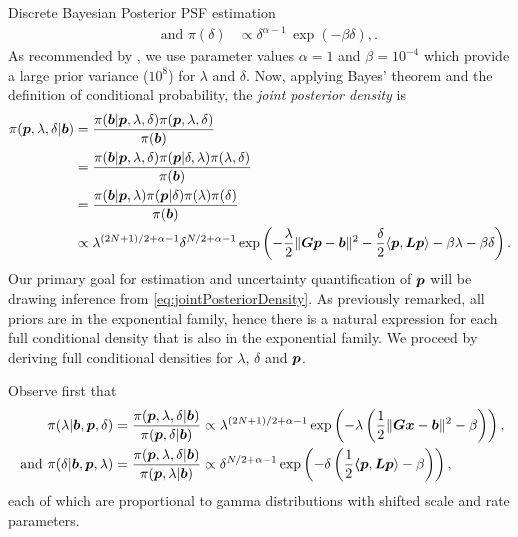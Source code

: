 \begin{chapter}{Discrete Bayesian Posterior PSF estimation}
\begin{align}
\quad\text{ and }\pi(\delta) &\propto \delta^{\alpha-1}\,\exp(-\beta\delta), \label{eq:lambdaPrior}.
\end{align}
As recommended by \citep{higdon2006primer}, we use parameter values $\alpha = 1$ and $\beta =  10^{-4}$ which provide a large prior variance ($10^8$) for $\lambda$ and $\delta$. 
Now, applying Bayes' theorem and the definition of conditional probability, the \emph{joint posterior density} is
\begin{align}
  \pi(\mbox{\boldmath$p$},\lambda,\delta|\mbox{\boldmath$b$}) 
    &= \frac{\pi(\mbox{\boldmath$b$}|\mbox{\boldmath$p$},\lambda,\delta) \pi(\mbox{\boldmath$p$},\lambda,\delta)}{\pi(\mbox{\boldmath$b$})} \nonumber \\
    &= \frac{\pi(\mbox{\boldmath$b$}|\mbox{\boldmath$p$},\lambda,\delta) \pi(\mbox{\boldmath$p$}| \delta,\lambda) \pi(\lambda,\delta)}{\pi(\mbox{\boldmath$b$})} \nonumber \\
    &= \frac{\pi(\mbox{\boldmath$b$}|\mbox{\boldmath$p$},\lambda) \pi(\mbox{\boldmath$p$}| \delta) \pi(\lambda)\pi(\delta)}{\pi(\mbox{\boldmath$b$})} \nonumber \\
    &\propto \lambda^{(2N+1)/2+\alpha-1}\delta^{N/2+\alpha-1} \exp\left(-\frac{\lambda}{2}\|\mbox{\boldmath$Gp$} - \mbox{\boldmath$b$}\|^2 - \frac{\delta}{2}\langle \mbox{\boldmath$p$}, \mbox{\boldmath$L$} \mbox{\boldmath$p$}\rangle - \beta\lambda - \beta\delta \right). \label{eq:jointPosteriorDensity}
\end{align}
Our primary goal for estimation and uncertainty quantification of $\mbox{\boldmath$p$}$ will be drawing inference from \eqref{eq:jointPosteriorDensity}.
As previously remarked, all priors are in the exponential family, hence there is a natural expression for each full conditional density that is also in the exponential family.
We proceed by deriving full conditional densities for $\lambda$, $\delta$ and $\mbox{\boldmath$p$}$.

Observe first that
\begin{align}
  \pi(\lambda| \mbox{\boldmath$b$},\mbox{\boldmath$p$},\delta) 
  &= \frac{\pi(\mbox{\boldmath$p$},\lambda,\delta|\mbox{\boldmath$b$})}{\pi(\mbox{\boldmath$p$},\delta|\mbox{\boldmath$b$}) } 
  \propto \lambda^{(2N+1)/2+\alpha-1}\exp\left(-\lambda\left(\frac{1}{2}\|\mbox{\boldmath$Gx$} - \mbox{\boldmath$b$}\|^2 - \beta\right)  \right), \nonumber\\
\text{ and }\pi(\delta| \mbox{\boldmath$b$},\mbox{\boldmath$p$},\lambda) 
  &= \frac{\pi(\mbox{\boldmath$p$},\lambda,\delta|\mbox{\boldmath$b$})}{\pi(\mbox{\boldmath$p$},\lambda|\mbox{\boldmath$b$}) } 
  \propto \delta^{N/2+\alpha-1}\exp\left(-\delta\left(\frac{1}{2}\mbox{\boldmath$\langle$} \mbox{\boldmath$p$},\mbox{\boldmath$L$}\mbox{\boldmath$p$} \rangle- \beta\right)  \right), \label{eq:lambdaDeltaConditional} 
\end{align}
each of which are proportional to gamma distributions with shifted scale and rate parameters.
 

\end{chapter}
